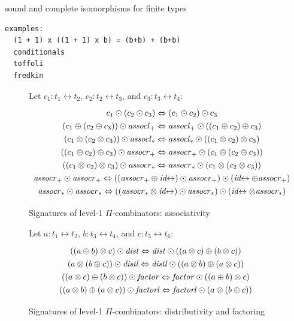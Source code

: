 \documentclass{article}
\newcommand{\assoclp}{\mathit{assocl}_+}
\newcommand{\assocrp}{\mathit{assocr}_+}
\newcommand{\assoclt}{\mathit{assocl}_*}
\newcommand{\assocrt}{\mathit{assocr}_*}
\newcommand{\dist}{\mathit{dist}}
\newcommand{\factor}{\mathit{factor}}
\newcommand{\distl}{\mathit{distl}}
\newcommand{\factorl}{\mathit{factorl}}
\newcommand{\idc}{\mathit{id}\!\!\leftrightarrow}
\begin{document}
sound and complete isomorphisms for finite types

\begin{verbatim}
examples:
  (1 + 1) x ((1 + 1) x b) = (b+b) + (b+b)
  conditionals
  toffoli
  fredkin
\end{verbatim}

\begin{figure}[t]
Let $c_1 : t_1 \leftrightarrow t_2$,  $c_2 : t_2 \leftrightarrow t_3$, and $c_3 : t_3 \leftrightarrow t_4$:
\[\def\arraystretch{1.3}
\begin{array}{c}
  {c_1 \odot (c_2 \odot c_3) \Leftrightarrow (c_1 \odot c_2) \odot c_3}
\\
  {(c_1 \oplus (c_2 \oplus c_3)) \odot \assoclp \Leftrightarrow \assoclp \odot ((c_1 \oplus c_2) \oplus c_3)}
\\
  {(c_1 \otimes (c_2 \otimes c_3)) \odot \assoclt \Leftrightarrow \assoclt \odot ((c_1 \otimes c_2) \otimes c_3)}
\\
  {((c_1 \oplus c_2) \oplus c_3) \odot \assocrp \Leftrightarrow \assocrp \odot (c_1 \oplus (c_2 \oplus c_3))}
\\
  {((c_1 \otimes c_2) \otimes c_3) \odot \assocrt \Leftrightarrow \assocrt \odot (c_1 \otimes (c_2 \otimes c_3))}
\\
  {\assocrp \odot \assocrp \Leftrightarrow ((\assocrp \oplus \idc) \odot \assocrp) \odot (\idc \oplus \assocrp)}
\\
  {\assocrt \odot \assocrt \Leftrightarrow ((\assocrt \otimes \idc) \odot \assocrt) \odot (\idc \otimes \assocrt)}
\end{array}\]
\caption{\label{figj}Signatures of level-1 $\Pi$-combinators: associativity}
\end{figure}

\begin{figure}[t]
Let $a : t_1 \leftrightarrow t_2$, $b : t_3 \leftrightarrow t_4$, and $c : t_5 \leftrightarrow t_6$:
\[\def\arraystretch{1.3}
\begin{array}{c}
  {((a \oplus b) \otimes c) \odot \dist \Leftrightarrow \dist \odot ((a \otimes c) \oplus (b \otimes c))}
\\
  {(a \otimes (b \oplus c)) \odot \distl \Leftrightarrow \distl \odot ((a \otimes b) \oplus (a \otimes c))}
\\
  {((a \otimes c) \oplus (b \otimes c)) \odot \factor \Leftrightarrow \factor \odot ((a \oplus b) \otimes c)}
\\
  {((a \otimes b) \oplus (a \otimes c)) \odot \factorl \Leftrightarrow \factorl \odot (a \otimes (b \oplus c))}
\end{array}\]
\caption{\label{figi}Signatures of level-1 $\Pi$-combinators: distributivity and factoring}
\end{figure}
\end{document}
